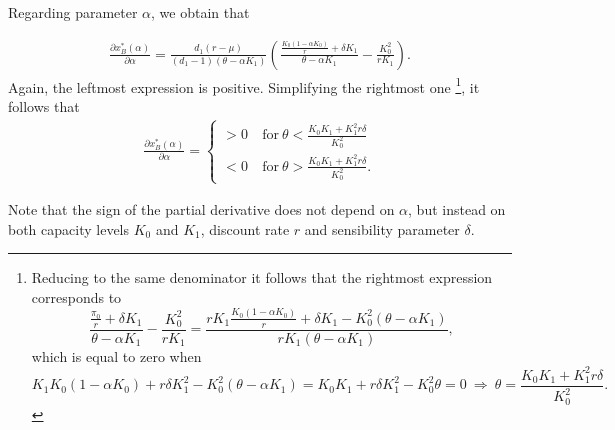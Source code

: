 Regarding parameter $\alpha$, we obtain that

\begin{align*}
\frac{\partial x^*_B ( \alpha ) }{\partial \alpha}= 
\frac{d_1 (r-\mu )}{ (d_1-1)(\theta-\alpha K_1)}  \left( \frac{\frac{K_0(1-\alpha K_0)}{r}+ \delta K_1  }{\theta-\alpha K_1} -\frac{ K_0^2}{r K_1} \right).
\end{align*}
Again, the leftmost expression is positive. Simplifying the rightmost one
\footnote{Reducing to the same denominator it follows that the rightmost expression corresponds to
	$$\frac{\frac{\pi_0}{r}+ \delta K_1  }{\theta-\alpha K_1} -\frac{ K_0^2}{r K_1} =
	\frac{r K_1 \frac{K_0(1-\alpha K_0)}{r}+ \delta K_1  -K_0^2(\theta-\alpha K_1)}{r K_1(\theta-\alpha K_1)},$$
	which is equal to zero when
	$$  K_1 K_0(1-\alpha K_0)+ r\delta K_1^2  -K_0^2(\theta-\alpha K_1)= K_0K_1+r\delta K_1^2-K_0^2 \theta=0 \ \Rightarrow \ \theta=\frac{K_0 K_1 +K_1^2 r\delta}{K_0^2}.
	$$
	},
it follows that
\begin{align*}
\frac{\partial x^*_B ( \alpha ) }{\partial \alpha}= 
\begin{cases}
>0 &\ \text{for} \ \theta < \frac{K_0 K_1 +K_1^2 r\delta}{K_0^2}\\
<0 &\ \text{for} \ \theta > \frac{K_0 K_1 +K_1^2 r\delta}{K_0^2}.
\end{cases}
\end{align*}

Note that the sign of the partial derivative does not depend on $\alpha$, but instead on both capacity levels $K_0$ and $K_1$, discount rate $r$ and sensibility parameter $\delta$.


